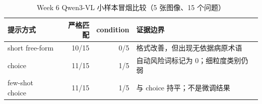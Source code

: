 \begin{table}[htbp]
\centering
\caption{Week 6 Qwen3-VL 小样本冒烟比较（5 张图像、15 个问题）}
\label{tab:week6-vlm-zh}
\begin{tabular}{lrrp{}}
\toprule
提示方式 & 严格匹配 & condition & 证据边界 \\
\midrule
short free-form & 10/15 & 0/5 & 格式改善，但出现无依据病原术语 \\
choice & 11/15 & 1/5 & 自动风险词标记为 0；细粒度类别仍弱 \\
few-shot choice & 11/15 & 1/5 & 与 choice 持平；不是微调结果 \\
\bottomrule
\end{tabular}
\end{table}
